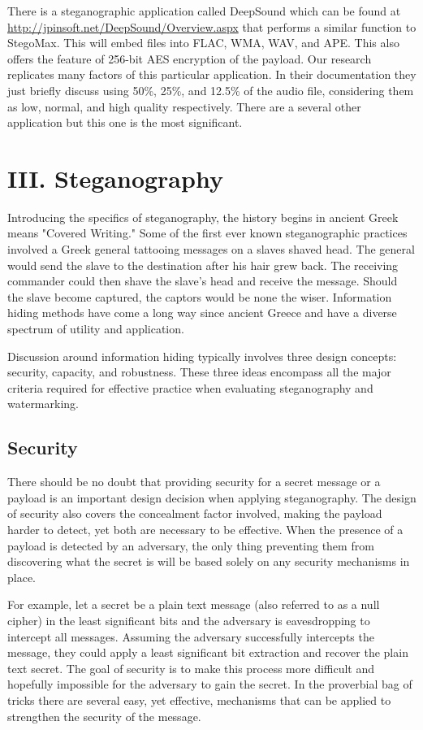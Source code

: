 \documentclass[letterpaper]{article}
\begin{document}
There is a steganographic application called DeepSound which can be found at \href{http://jpinsoft.net/DeepSound/Overview.aspx}{http://jpinsoft.net/DeepSound/Overview.aspx}
that performs a similar function to StegoMax. This will embed files into FLAC, WMA, WAV, and APE. This also offers the feature of 256-bit AES encryption of the payload. Our research replicates many factors of this particular application. In their documentation they just briefly discuss using 50\%, 25\%, and 12.5\% of the audio file, considering them as low, normal, and high quality respectively. There are a several other application but this one is the most significant.


\section{III. Steganography}
Introducing the specifics of steganography, the history begins in ancient Greek means "Covered Writing." Some of the first ever known steganographic practices involved a Greek general tattooing messages on a slaves shaved head. The general would send the slave to the destination after his hair grew back. The receiving commander could then shave the slave's head and receive the message. Should the slave become captured, the captors would be none the wiser.\cite{survey} Information hiding methods have come a long way since ancient Greece and have a diverse spectrum of utility and application. 

Discussion around information hiding typically involves three design concepts: security, capacity, and robustness. These three ideas encompass all the major criteria required for effective practice when evaluating steganography and watermarking.

\subsection{Security}
There should be no doubt that providing security for a secret message or a payload is an important design decision when applying steganography. The design of security also covers the concealment factor involved, making the payload harder to detect, yet both are necessary to be effective. When the presence of a payload is detected by an adversary, the only thing preventing them from discovering what the secret is will be based solely on any security mechanisms in place. 

For example, let a secret be a plain text message (also referred to as a null cipher) in the least significant bits and the adversary is eavesdropping to intercept all messages. Assuming the adversary successfully intercepts the message, they could apply a least significant bit extraction and recover the plain text secret. The goal of security is to make this process more difficult and hopefully impossible for the adversary to gain the secret. In the proverbial bag of tricks there are several easy, yet effective, mechanisms that can be applied to strengthen the security of the message.
\end{document}
